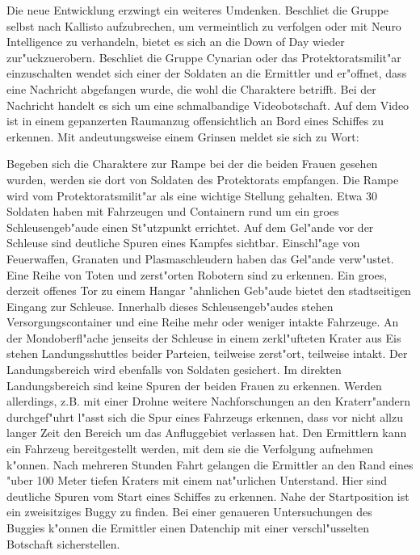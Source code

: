 Die neue Entwicklung erzwingt ein weiteres Umdenken. Beschlie\3t die Gruppe selbst nach Kallisto aufzubrechen, um \xl{} vermeintlich zu verfolgen oder mit Neuro Intelligence zu verhandeln, bietet es sich an die Down of Day wieder zur"uckzuerobern. Beschlie\3t die Gruppe Cynarian oder das Protektoratsmilit"ar einzuschalten wendet sich einer der Soldaten an die Ermittler und er"offnet, dass eine Nachricht abgefangen wurde, die wohl die Charaktere betrifft. Bei der Nachricht handelt es sich um eine schmalbandige Videobotschaft. Auf dem Video ist \xl{} in einem gepanzerten Raumanzug offensichtlich an Bord eines Schiffes zu erkennen. Mit andeutungsweise einem Grinsen meldet sie sich zu Wort:


Begeben sich die Charaktere zur Rampe bei der die beiden Frauen gesehen wurden, werden sie dort von Soldaten des Protektorats empfangen. Die Rampe wird vom Protektoratsmilit"ar als eine wichtige Stellung gehalten. Etwa 30 Soldaten haben mit Fahrzeugen und Containern rund um ein gro\3es Schleusengeb"aude einen St"utzpunkt errichtet. Auf dem Gel"ande vor der Schleuse sind deutliche Spuren eines Kampfes sichtbar. Einschl"age von Feuerwaffen, Granaten und Plasmaschleudern haben das Gel"ande verw"ustet. Eine Reihe von Toten und zerst"orten Robotern sind zu erkennen. Ein gro\3es, derzeit offenes Tor zu einem Hangar "ahnlichen Geb"aude bietet den stadtseitigen Eingang zur Schleuse. Innerhalb dieses Schleusengeb"audes stehen Versorgungscontainer und eine Reihe mehr oder weniger intakte Fahrzeuge. An der Mondoberfl"ache jenseits der Schleuse in einem zerkl"ufteten Krater aus Eis stehen Landungsshuttles beider Parteien, teilweise zerst"ort, teilweise intakt. Der Landungsbereich wird ebenfalls von Soldaten gesichert. Im direkten Landungsbereich sind keine Spuren der beiden Frauen zu erkennen. Werden allerdings, z.B. mit einer Drohne weitere Nachforschungen an den Kraterr"andern durchgef"uhrt l"asst sich die Spur eines Fahrzeugs erkennen, dass vor nicht allzu langer Zeit den Bereich um das Anfluggebiet verlassen hat. Den Ermittlern kann ein Fahrzeug bereitgestellt werden, mit dem sie die Verfolgung aufnehmen k"onnen. Nach mehreren Stunden Fahrt gelangen die Ermittler an den Rand eines "uber 100 Meter tiefen Kraters mit einem nat"urlichen Unterstand. Hier sind deutliche Spuren vom Start eines Schiffes zu erkennen. Nahe der Startposition ist ein zweisitziges Buggy zu finden. Bei einer genaueren Untersuchungen des Buggies k"onnen die Ermittler einen Datenchip mit einer verschl"usselten Botschaft sicherstellen.

